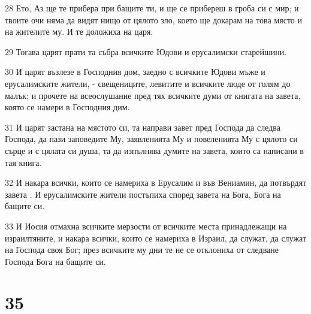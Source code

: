 \par 28 Ето, Аз ще те прибера при бащите ти, и ще се прибереш в гроба си с мир; и твоите очи няма да видят нищо от цялото зло, което ще докарам на това място и на жителите му. И те доложиха на царя.
\par 29 Тогава царят прати та събра всичките Юдови и ерусалимски старейшини.
\par 30 И царят възлезе в Господния дом, заедно с всичките Юдови мъже и ерусалимските жители, - свещениците, левитите и всичките люде от голям до малък; и прочете на всеослушание пред тях всичките думи от книгата на завета, която се намери в Господния дим.
\par 31 И царят застана на мястото си, та направи завет пред Господа да следва Господа, да пази заповедите Му, заявленията Му и повеленията Му с цялото си сърце и с цялата си душа, та да изпълнява думите на завета, които са написани в тая книга.
\par 32 И накара всички, които се намериха в Ерусалим и във Вениамин, да потвърдят завета . И ерусалимските жители постъпиха според завета на Бога, Бога на бащите си.
\par 33 И Иосия отмахна всичките мерзости от всичките места принадлежащи на израилтяните, и накара всички, които се намериха в Израил, да служат, да служат на Господа своя Бог; през всичките му дни те не се отклониха от следване Господа Бога на бащите си.

\chapter{35}

